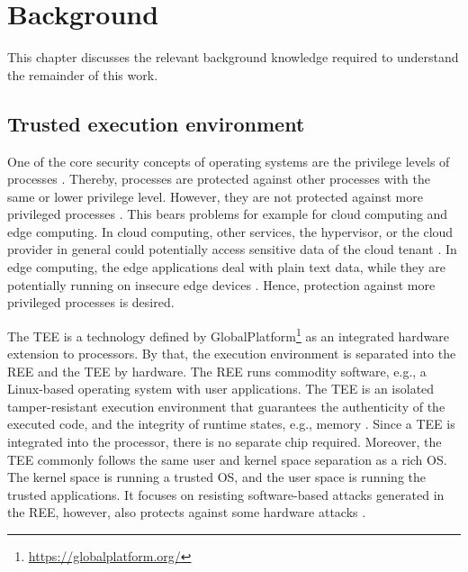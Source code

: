 
\chapter{Background}\label{chapter:background}

This chapter discusses the relevant background knowledge required to understand the remainder of this work.

\section{Trusted execution environment}


One of the core security concepts of operating systems are the privilege levels of processes \cite{Linden1976}. Thereby, processes are protected against other processes with the same or lower privilege level. However, they are not protected against more privileged processes \cite{Bratus2009}. This bears problems for example for cloud computing and edge computing. In cloud computing, other services, the hypervisor, or the cloud provider in general could potentially access sensitive data of the cloud tenant \cite{Nimgaonkar2012}. In edge computing, the edge applications deal with plain text data, while they are potentially running on insecure edge devices \cite{Ning2018}. Hence, protection against more privileged processes is desired.



The \acf{TEE} is a technology defined by GlobalPlatform\footnote{\url{https://globalplatform.org/}} as an integrated hardware extension to processors. By that, the execution environment is separated into the \ac{REE} and the \ac{TEE} by hardware.
The \ac{REE} runs commodity software, e.g., a Linux-based operating system with user applications.
The TEE is an isolated tamper-resistant execution environment that guarantees the authenticity of the executed code, and the integrity of runtime states, e.g., memory \cite{Sabt2015}.
Since a \ac{TEE} is integrated into the processor, there is no separate chip required.
Moreover, the \ac{TEE} commonly follows the same user and kernel space separation as a rich OS. The kernel space is running a trusted OS, and the user space is running the trusted applications. 
It focuses on resisting software-based attacks generated in the \ac{REE}, however, also protects against some hardware attacks \cite{GPSysArch}.


